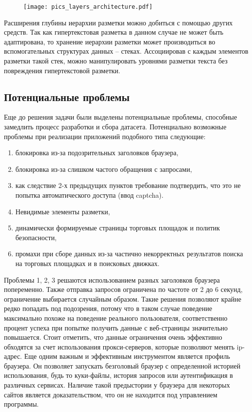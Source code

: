 \documentclass[../main]{subfiles}
\begin{document}
\begin{figure}[H]
    \centering
    {\texttt{[image: pics\_layers\_architecture.pdf]}}
    \vspace{-\baselineskip}
\end{figure}

Расширения глубины иерархии разметки можно добиться с помощью других средств. Так как гипертекстовая разметка в данном случае не может быть адаптирована, то хранение иерархии разметки может производиться во вспомогательных структурах данных -- стеках. Ассоциировав с каждым элементов разметки такой стек, можно манипулировать уровнями разметки текста без повреждения гипертекстовой разметки. 

\subsection{Потенциальные проблемы}
Еще до решения задачи были выделены потенциальные проблемы, способные замедлить процесс разработки и сбора датасета. Потенциально возможные проблемы при реализации приложений подобного типа следующие:
\begin{enumerate}
    \item блокировка из-за подозрительных заголовков браузера,
    \item блокировка из-за слишком частого обращения с запросами,
    \item как следствие 2-х предыдущих пунктов требование подтвердить, что это не попытка автоматического доступа (ввод captcha).
    \item Невидимые элементы разметки,
    \item динамически формируемые страницы торговых площадок и политик безопасности,
    \item промахи при сборе данных из-за частично некорректных результатов поиска на торговых площадках и в поисковых движках.
\end{enumerate}

Проблемы 1, 2, 3 решаются использованием разных заголовков браузера попеременно. Также отправка запросов ограничена по частоте от 2 до 6 секунд, ограничение выбирается случайным образом. Такие решения позволяют крайне редко попадать под подозрения, потому что в таком случае поведение максимально похоже на поведение реального пользователя, соответственно процент успеха при попытке получить данные с веб-страницы значительно повышается. Стоит отметить, что данные ограничения очень эффективно обходятся за счет использования прокси-серверов, которые позволяют менять ip-адрес. Еще одним важным и эффективным инструментом является профиль браузера. Он позволяет запускать безголовый браузер с определенной историей использования, будь то куки-файлы, история запросов или аутентификация в различных сервисах. Наличие такой предыстории у браузера для некоторых сайтов является доказательством, что он не находится под управлением программы.
\end{document}
